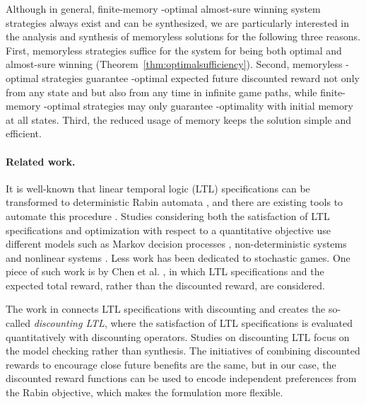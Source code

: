 \documentclass[runningheads,a4paper]{llncs}
\begin{document}
Although in general, finite-memory -optimal almost-sure winning system strategies always exist and can be synthesized, we are particularly interested in the analysis and synthesis of memoryless solutions for the following three reasons. First, memoryless strategies suffice for the system for being both optimal and almost-sure winning (Theorem~\ref{thm:optimalsufficiency}). Second, memoryless -optimal strategies guarantee -optimal expected future discounted reward not only from any state and but also from any time in infinite game paths, while finite-memory -optimal strategies may only guarantee -optimality with initial memory at all states. Third, the reduced usage of memory keeps the solution simple and efficient.











\paragraph{Related work.} 
It is well-known that linear temporal logic (LTL) specifications can be transformed to deterministic Rabin automata \cite{babiak2013effective}, and there are existing tools to automate this procedure \cite{klein2005linear, gaiser2012rabinizer,  blahoudek2015ltl3dra, klein2015ltl2dstar}. Studies considering both the satisfaction of LTL specifications and optimization with respect to a quantitative objective use different models such as Markov decision processes \cite{wolff2012optimal, ding2014optimal}, non-deterministic systems \cite{wolff2013optimal} and nonlinear systems \cite{wolff2013nonlinear}. Less work has been dedicated to stochastic games. One piece of such work is by Chen et al. \cite{chen2013synthesis}, in which LTL specifications and the expected total reward, rather than the discounted reward, are considered. 

The work in \cite{de2003discounting, almagor2014discounting} connects LTL specifications with discounting and creates the so-called \emph{discounting LTL}, where the satisfaction of LTL specifications is evaluated quantitatively with discounting operators. Studies on discounting LTL focus on the model checking rather than synthesis. The initiatives of combining discounted rewards to encourage close future benefits are the same, but in our case, the discounted reward functions can be used to encode independent preferences from the Rabin objective, which makes the formulation more flexible. 
\end{document}
